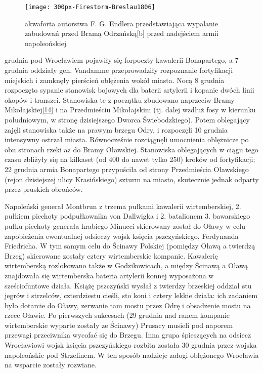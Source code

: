 \documentclass{article}
\begin{document}
\begin{figure}[h]
\centering

\texttt{[image: 300px-Firestorm-Breslau1806]}
\caption{akwaforta autorstwa F. G. Endlera przedstawiająca wypalanie zabudowań przed Bramą Odrzańską[b] przed nadejściem armii napoleońskiej}
\label{rysunek6}

\end{figure}

 grudnia pod Wrocławiem pojawiły się forpoczty kawalerii Bonapartego, a 7 grudnia oddziały gen. Vandamme przeprowadziły rozpoznanie fortyfikacji miejskich i zamknęły pierścień oblężenia wokół miasta. Nocą 8 grudnia rozpoczęto sypanie stanowisk bojowych dla baterii artylerii i kopanie dwóch linii okopów i transzei. Stanowiska te z początku zbudowano naprzeciw Bramy Mikołajskiej\hyperref[14]{[14]}\label{114} i na Przedmieściu Mikołajskim (tj. dalej wzdłuż fosy w kierunku południowym, w stronę dzisiejszego Dworca Świebodzkiego). Potem oblegający zajęli stanowiska także na prawym brzegu Odry, i rozpoczęli 10 grudnia intensywny ostrzał miasta. Równocześnie rozciągnęli umocnienia oblężnicze po obu stronach rzeki aż do Bramy Oławskiej. Stanowiska oblegających w ciągu tego czasu zbliżyły się na kilkaset (od 400 do nawet tylko 250) kroków od fortyfikacji; 22 grudnia armia Bonapartego przypuściła od strony Przedmieścia Oławskiego (rejon dzisiejszej ulicy Krasińskiego) szturm na miasto, skutecznie jednak odparty przez pruskich obrońców.

\vspace{6pt}

\noindent Napoleński generał Montbrun z trzema pułkami kawalerii wirtemberskiej, 2. pułkiem piechoty podpułkownika von Dallwigka i 2. batalionem 3. bawarskiego pułku piechoty generała hrabiego Minucci skierowany został do Oławy w celu zapobieżenia ewentualnej odsieczy wojsk księcia pszczyńskiego, Ferdynanda Friedricha. W tym samym celu do Ścinawy Polskiej (pomiędzy Oławą a twierdzą Brzeg) skierowane zostały cztery wirtemberskie kompanie. Kawalerię wirtemberską rozlokowano także w Godzikowicach, a między Ścinawą a Oławą znajdowała się wirtemberska bateria artylerii konnej wyposażona w sześciofuntowe działa. Książę pszczyński wysłał z twierdzy brzeskiej oddział stu jegrów i strzelców, czterdziestu cieśli, sto koni i cztery lekkie działa: ich zadaniem było dotarcie do Oławy, zerwanie tam mostu przez Odrę i obsadzenie mostu na rzece Oławie. Po pierwszych sukcesach (29 grudnia nad ranem kompanie wirtemberskie wyparte zostały ze Ścinawy) Prusacy musieli pod naporem przewagi przeciwnika wycofać się do Brzegu. Inna grupa śpieszących na odsiecz Wrocławiowi wojsk księcia pszczyńskiego rozbita została 30 grudnia przez wojska napoleońskie pod Strzelinem. W ten sposób nadzieje załogi oblężonego Wrocławia na wsparcie zostały rozwiane.
\end{document}
